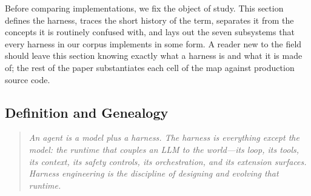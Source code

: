 \documentclass[11pt,a4paper]{article}
\begin{document}
Before comparing implementations, we fix the object of study.
This section defines the harness, traces the short history of the term, separates it from the concepts it is routinely confused with, and lays out the seven subsystems that every harness in our corpus implements in some form.
A reader new to the field should leave this section knowing exactly what a harness is and what it is made of; the rest of the paper substantiates each cell of the map against production source code.

\subsection{Definition and Genealogy}
\label{sec:genealogy}

\begin{quote}
\emph{An agent is a model plus a harness. The harness is everything except the model: the runtime that couples an LLM to the world---its loop, its tools, its context, its safety controls, its orchestration, and its extension surfaces. Harness engineering is the discipline of designing and evolving that runtime.}
\end{quote}
\end{document}
